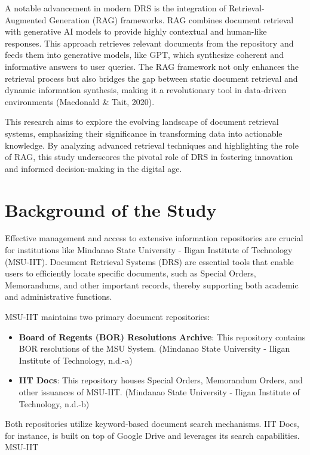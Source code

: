 \noindent A notable advancement in modern DRS is the integration of Retrieval-Augmented Generation (RAG) frameworks. RAG combines document retrieval with generative AI models to provide highly contextual and human-like responses. This approach retrieves relevant documents from the repository and feeds them into generative models, like GPT, which synthesize coherent and informative answers to user queries. The RAG framework not only enhances the retrieval process but also bridges the gap between static document retrieval and dynamic information synthesis, making it a revolutionary tool in data-driven environments (Macdonald & Tait, 2020).

This research aims to explore the evolving landscape of document retrieval systems, emphasizing their significance in transforming data into actionable knowledge. By analyzing advanced retrieval techniques and highlighting the role of RAG, this study underscores the pivotal role of DRS in fostering innovation and informed decision-making in the digital age.


\section{Background of the Study}

\noindent Effective management and access to extensive information repositories are crucial for institutions like Mindanao State University - Iligan Institute of Technology (MSU-IIT). Document Retrieval Systems (DRS) are essential tools that enable users to efficiently locate specific documents, such as Special Orders, Memorandums, and other important records, thereby supporting both academic and administrative functions.

\noindent MSU-IIT maintains two primary document repositories:

\begin{itemize}
    \item \textbf{Board of Regents (BOR) Resolutions Archive}: This repository contains BOR resolutions of the MSU System. (Mindanao State University - Iligan Institute of Technology, n.d.-a)
    \item \textbf{IIT Docs}: This repository houses Special Orders, Memorandum Orders, and other issuances of MSU-IIT. (Mindanao State University - Iligan Institute of Technology, n.d.-b)
\end{itemize}

\noindent Both repositories utilize keyword-based document search mechanisms. IIT Docs, for instance, is built on top of Google Drive and leverages its search capabilities. 
MSU-IIT


